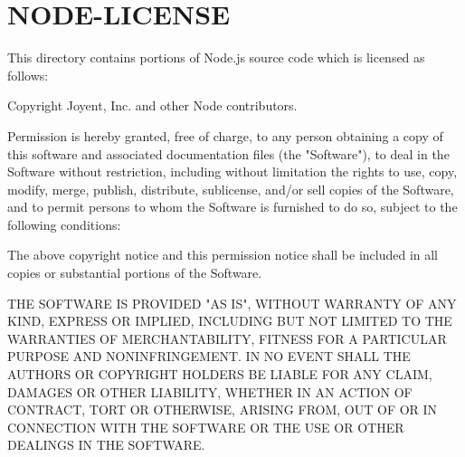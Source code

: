 \chapter{NODE-\/\+LICENSE}
\hypertarget{md_node__modules_2ts-node_2dist-raw_2_n_o_d_e-_l_i_c_e_n_s_e}{}\label{md_node__modules_2ts-node_2dist-raw_2_n_o_d_e-_l_i_c_e_n_s_e}
This directory contains portions of Node.\+js source code which is licensed as follows\+:



Copyright Joyent, Inc. and other Node contributors.

Permission is hereby granted, free of charge, to any person obtaining a copy of this software and associated documentation files (the "{}\+Software"{}), to deal in the Software without restriction, including without limitation the rights to use, copy, modify, merge, publish, distribute, sublicense, and/or sell copies of the Software, and to permit persons to whom the Software is furnished to do so, subject to the following conditions\+:

The above copyright notice and this permission notice shall be included in all copies or substantial portions of the Software.

THE SOFTWARE IS PROVIDED "{}\+AS IS"{}, WITHOUT WARRANTY OF ANY KIND, EXPRESS OR IMPLIED, INCLUDING BUT NOT LIMITED TO THE WARRANTIES OF MERCHANTABILITY, FITNESS FOR A PARTICULAR PURPOSE AND NONINFRINGEMENT. IN NO EVENT SHALL THE AUTHORS OR COPYRIGHT HOLDERS BE LIABLE FOR ANY CLAIM, DAMAGES OR OTHER LIABILITY, WHETHER IN AN ACTION OF CONTRACT, TORT OR OTHERWISE, ARISING FROM, OUT OF OR IN CONNECTION WITH THE SOFTWARE OR THE USE OR OTHER DEALINGS IN THE SOFTWARE. 